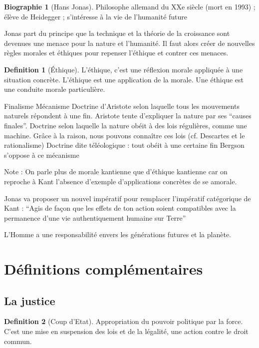 \documentclass[french]{book}
\theoremstyle{definition}
\newtheorem*{dfn}{Definition}
\newtheorem*{bio}{Biographie}
\begin{document}
\begin{bio}[Hans Jonas]
	Philosophe allemand du XXe siècle (mort en 1993) ; élève de Heidegger ; s’intéresse à la vie de l’humanité future
\end{bio}

Jonas part du principe que la technique et la théorie de la croissance sont devenues une menace pour la nature et l’humanité. Il faut alors créer de nouvelles règles morales et éthiques pour repenser l’éthique et contrer ces menaces.

\begin{dfn}[Éthique]
	L'éthique, c’est une réflexion morale appliquée à une situation concrète. L’éthique est une application de la morale. Une éthique est une conduite morale particulière.
\end{dfn}



Finalisme
Mécanisme
Doctrine d'Aristote selon laquelle tous les mouvements naturels répondent à une fin. Aristote tente d’expliquer la nature par ses “causes finales”.
Doctrine selon laquelle la nature obéit à des lois régulières, comme une machine. Grâce à la raison, nous pouvons connaître ces lois (cf. Descartes et le rationalisme) 
Doctrine dite téléologique : tout obéit à une certaine fin
Bergson s’oppose à ce mécanisme


Note : On parle plus de morale kantienne que d’éthique kantienne car on reproche à Kant l’absence d’exemple d’applications concrètes de se amorale.

Jonas va proposer un nouvel impératif pour remplacer l’impératif catégorique de Kant : 
“Agis de façon que les effets de ton action soient compatibles avec la permanence d’une vie authentiquement humaine sur Terre”

L’Homme a une responsabilité envers les générations futures et la planète.

\section{Définitions complémentaires}
\subsection{La justice}

\begin{dfn}[Coup d’Etat]
Appropriation du pouvoir politique par la force. C’est une mise en suspension des lois et de la légalité, une action contre le droit commun.
\end{dfn}
\end{document}
